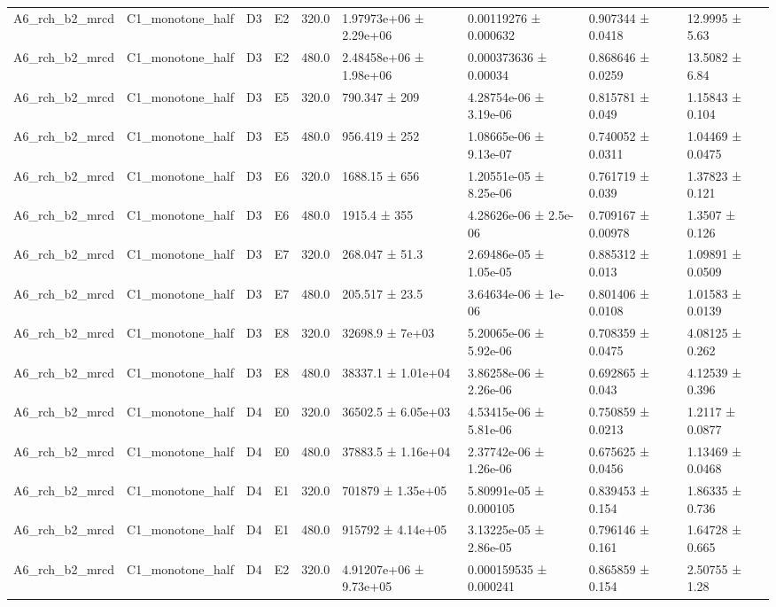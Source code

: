 \begin{table}
\begin{tabular}{lllllllll}
A6\_rch\_b2\_mrcd & C1\_monotone\_half & D3 & E2 & 320.0 & 1.97973e+06 ± 2.29e+06 & 0.00119276 ± 0.000632 & 0.907344 ± 0.0418 & 12.9995 ± 5.63 \\
A6\_rch\_b2\_mrcd & C1\_monotone\_half & D3 & E2 & 480.0 & 2.48458e+06 ± 1.98e+06 & 0.000373636 ± 0.00034 & 0.868646 ± 0.0259 & 13.5082 ± 6.84 \\
A6\_rch\_b2\_mrcd & C1\_monotone\_half & D3 & E5 & 320.0 & 790.347 ± 209 & 4.28754e-06 ± 3.19e-06 & 0.815781 ± 0.049 & 1.15843 ± 0.104 \\
A6\_rch\_b2\_mrcd & C1\_monotone\_half & D3 & E5 & 480.0 & 956.419 ± 252 & 1.08665e-06 ± 9.13e-07 & 0.740052 ± 0.0311 & 1.04469 ± 0.0475 \\
A6\_rch\_b2\_mrcd & C1\_monotone\_half & D3 & E6 & 320.0 & 1688.15 ± 656 & 1.20551e-05 ± 8.25e-06 & 0.761719 ± 0.039 & 1.37823 ± 0.121 \\
A6\_rch\_b2\_mrcd & C1\_monotone\_half & D3 & E6 & 480.0 & 1915.4 ± 355 & 4.28626e-06 ± 2.5e-06 & 0.709167 ± 0.00978 & 1.3507 ± 0.126 \\
A6\_rch\_b2\_mrcd & C1\_monotone\_half & D3 & E7 & 320.0 & 268.047 ± 51.3 & 2.69486e-05 ± 1.05e-05 & 0.885312 ± 0.013 & 1.09891 ± 0.0509 \\
A6\_rch\_b2\_mrcd & C1\_monotone\_half & D3 & E7 & 480.0 & 205.517 ± 23.5 & 3.64634e-06 ± 1e-06 & 0.801406 ± 0.0108 & 1.01583 ± 0.0139 \\
A6\_rch\_b2\_mrcd & C1\_monotone\_half & D3 & E8 & 320.0 & 32698.9 ± 7e+03 & 5.20065e-06 ± 5.92e-06 & 0.708359 ± 0.0475 & 4.08125 ± 0.262 \\
A6\_rch\_b2\_mrcd & C1\_monotone\_half & D3 & E8 & 480.0 & 38337.1 ± 1.01e+04 & 3.86258e-06 ± 2.26e-06 & 0.692865 ± 0.043 & 4.12539 ± 0.396 \\
A6\_rch\_b2\_mrcd & C1\_monotone\_half & D4 & E0 & 320.0 & 36502.5 ± 6.05e+03 & 4.53415e-06 ± 5.81e-06 & 0.750859 ± 0.0213 & 1.2117 ± 0.0877 \\
A6\_rch\_b2\_mrcd & C1\_monotone\_half & D4 & E0 & 480.0 & 37883.5 ± 1.16e+04 & 2.37742e-06 ± 1.26e-06 & 0.675625 ± 0.0456 & 1.13469 ± 0.0468 \\
A6\_rch\_b2\_mrcd & C1\_monotone\_half & D4 & E1 & 320.0 & 701879 ± 1.35e+05 & 5.80991e-05 ± 0.000105 & 0.839453 ± 0.154 & 1.86335 ± 0.736 \\
A6\_rch\_b2\_mrcd & C1\_monotone\_half & D4 & E1 & 480.0 & 915792 ± 4.14e+05 & 3.13225e-05 ± 2.86e-05 & 0.796146 ± 0.161 & 1.64728 ± 0.665 \\
A6\_rch\_b2\_mrcd & C1\_monotone\_half & D4 & E2 & 320.0 & 4.91207e+06 ± 9.73e+05 & 0.000159535 ± 0.000241 & 0.865859 ± 0.154 & 2.50755 ± 1.28 \\

\end{tabular}
\end{table}
